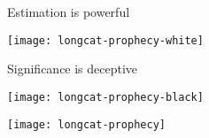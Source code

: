 \documentclass[t]{beamer}
\begin{document}
  \begin{frame}[plain, c]{Estimation is powerful}

		\begin{center}
			\texttt{[image: longcat-prophecy-white]}
    \end{center}
		  
  \end{frame}
	
  \begin{frame}[plain, c]{Significance is deceptive}

		\begin{center}
			\texttt{[image: longcat-prophecy-black]}
    \end{center}
		  
  \end{frame}
	
  \begin{frame}[plain, c]{}

		\begin{center}
			\texttt{[image: longcat-prophecy]}
    \end{center}
		  
  \end{frame}
	
\end{document}
